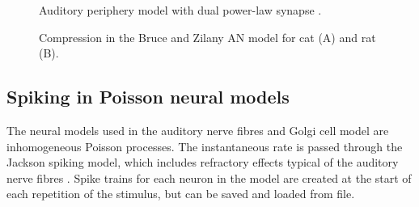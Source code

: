 



\begin{figure}[htb]
  \begin{center}
    \caption[Auditory periphery model]{Auditory periphery model with dual power-law synapse \citep[originally printed in ][]{ZilanyBruceEtAl:2009}.
\label{fig:ZilanyBruceFig}}
  \end{center}
\end{figure}



\begin{figure}[htb]
  \centering
  \caption{Compression in the Bruce and Zilany AN model for cat (A) and rat (B).}
  \label{fig:Compression}
\end{figure}



\subsection{Spiking in Poisson neural models}

The neural models used in the auditory nerve fibres and Golgi cell model are
inhomogeneous Poisson processes.  The instantaneous rate is passed through the
Jackson spiking model, which includes refractory effects typical of the auditory
nerve fibres \citep{Jackson:2003,JacksonCarney:2005}.  Spike trains for each
neuron in the model are created at the start of each repetition of the stimulus,
but can be saved and loaded from file.




